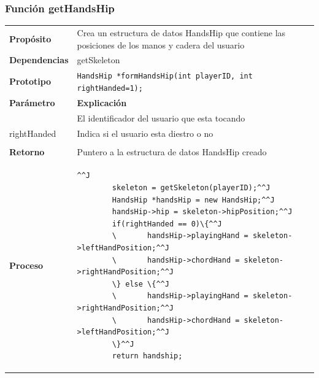 \documentclass[a4paper,10pt]{article}
\begin{document}
\subsubsection{Función getHandsHip}
\begin{tabularx}{\textwidth}{p{25mm} X}
        \textbf{Propósito} & Crea un estructura de datos HandsHip que contiene
        las posiciones de los manos y cadera del usuario\\
        \textbf{Dependencias} & getSkeleton\\
        \textbf{Prototipo} & \lstinline{HandsHip *formHandsHip(int playerID, int rightHanded=1);}\\
        \textbf{Parámetro} & \textbf{Explicación} \\
        \begin{tabular}{p{2cm} l}
                playerID & El identificador del usuario que esta tocando \\
                rightHanded & Indica si el usuario esta diestro o no \\
        \end{tabular} \\

        \textbf{Retorno} & Puntero a la estructura de datos HandsHip creado\\
        \textbf{Proceso} & 
        \begin{lstlisting}[breaklines=true]^^J
        skeleton = getSkeleton(playerID);^^J
        HandsHip *handsHip = new HandsHip;^^J
        handsHip->hip = skeleton->hipPosition;^^J
        if(rightHanded == 0)\{^^J
        \       handsHip->playingHand = skeleton->leftHandPosition;^^J
        \       handsHip->chordHand = skeleton->rightHandPosition;^^J
        \} else \{^^J
        \       handsHip->playingHand = skeleton->rightHandPosition;^^J
        \       handsHip->chordHand = skeleton->leftHandPosition;^^J
        \}^^J
        return handship;
        \end{lstlisting} \\
\end{tabularx}
\end{document}
